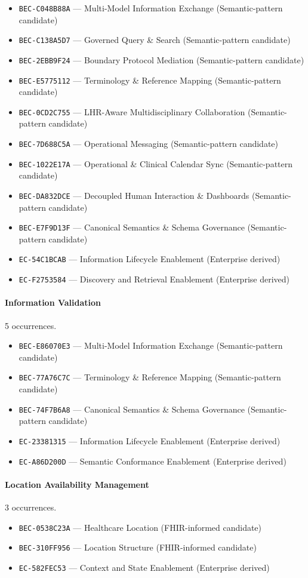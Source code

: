 \documentclass[11pt,a4paper,openany]{book}
\begin{document}
\begin{itemize}
\item \texttt{BEC-C048B88A} --- Multi-Model Information Exchange (Semantic-pattern candidate)
\item \texttt{BEC-C138A5D7} --- Governed Query \& Search (Semantic-pattern candidate)
\item \texttt{BEC-2EBB9F24} --- Boundary Protocol Mediation (Semantic-pattern candidate)
\item \texttt{BEC-E5775112} --- Terminology \& Reference Mapping (Semantic-pattern candidate)
\item \texttt{BEC-0CD2C755} --- LHR-Aware Multidisciplinary Collaboration (Semantic-pattern candidate)
\item \texttt{BEC-7D688C5A} --- Operational Messaging (Semantic-pattern candidate)
\item \texttt{BEC-1022E17A} --- Operational \& Clinical Calendar Sync (Semantic-pattern candidate)
\item \texttt{BEC-DA832DCE} --- Decoupled Human Interaction \& Dashboards (Semantic-pattern candidate)
\item \texttt{BEC-E7F9D13F} --- Canonical Semantics \& Schema Governance (Semantic-pattern candidate)
\item \texttt{EC-54C1BCAB} --- Information Lifecycle Enablement (Enterprise derived)
\item \texttt{EC-F2753584} --- Discovery and Retrieval Enablement (Enterprise derived)
\end{itemize}
\paragraph{Information Validation} 5 occurrences.\par
\begin{itemize}
\item \texttt{BEC-E86070E3} --- Multi-Model Information Exchange (Semantic-pattern candidate)
\item \texttt{BEC-77A76C7C} --- Terminology \& Reference Mapping (Semantic-pattern candidate)
\item \texttt{BEC-74F7B6A8} --- Canonical Semantics \& Schema Governance (Semantic-pattern candidate)
\item \texttt{EC-23381315} --- Information Lifecycle Enablement (Enterprise derived)
\item \texttt{EC-A86D200D} --- Semantic Conformance Enablement (Enterprise derived)
\end{itemize}
\paragraph{Location Availability Management} 3 occurrences.\par
\begin{itemize}
\item \texttt{BEC-0538C23A} --- Healthcare Location (FHIR-informed candidate)
\item \texttt{BEC-310FF956} --- Location Structure (FHIR-informed candidate)
\item \texttt{EC-582FEC53} --- Context and State Enablement (Enterprise derived)
\end{itemize}
\end{document}
